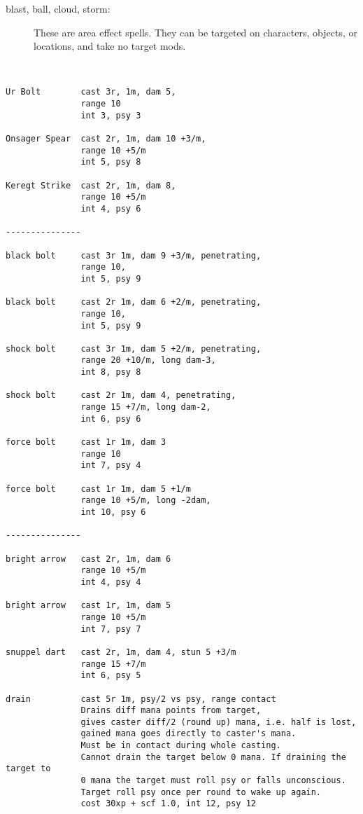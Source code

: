 \begin{description}
\item[blast, ball, cloud, storm:]
These are area effect spells. They can be targeted on characters, objects, or locations, and take no target mods.


\end{description}

\

\small \begin{verbatim}
Ur Bolt        cast 3r, 1m, dam 5,
               range 10
               int 3, psy 3

Onsager Spear  cast 2r, 1m, dam 10 +3/m,
               range 10 +5/m
               int 5, psy 8

Keregt Strike  cast 2r, 1m, dam 8,
               range 10 +5/m
               int 4, psy 6

---------------

black bolt     cast 3r 1m, dam 9 +3/m, penetrating,
               range 10, 
               int 5, psy 9

black bolt     cast 2r 1m, dam 6 +2/m, penetrating,
               range 10,
               int 5, psy 9

shock bolt     cast 3r 1m, dam 5 +2/m, penetrating,
               range 20 +10/m, long dam-3,
               int 8, psy 8

shock bolt     cast 2r 1m, dam 4, penetrating,
               range 15 +7/m, long dam-2,
               int 6, psy 6

force bolt     cast 1r 1m, dam 3
               range 10
               int 7, psy 4

force bolt     cast 1r 1m, dam 5 +1/m
               range 10 +5/m, long -2dam,
               int 10, psy 6

---------------

bright arrow   cast 2r, 1m, dam 6
               range 10 +5/m
               int 4, psy 4

bright arrow   cast 1r, 1m, dam 5
               range 10 +5/m
               int 7, psy 7

snuppel dart   cast 2r, 1m, dam 4, stun 5 +3/m
               range 15 +7/m
               int 6, psy 5

drain          cast 5r 1m, psy/2 vs psy, range contact
               Drains diff mana points from target,
               gives caster diff/2 (round up) mana, i.e. half is lost,
               gained mana goes directly to caster's mana.
               Must be in contact during whole casting.
               Cannot drain the target below 0 mana. If draining the target to
               0 mana the target must roll psy or falls unconscious. 
               Target roll psy once per round to wake up again.
               cost 30xp + scf 1.0, int 12, psy 12


\end{verbatim}
